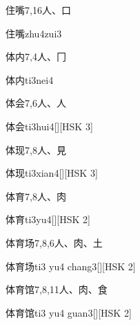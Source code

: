 \begin{entry}{住嘴}{7,16}{⼈、⼝}
  \begin{phonetics}{住嘴}{zhu4zui3}
  \end{phonetics}
\end{entry}

\begin{entry}{体内}{7,4}{⼈、⼌}
  \begin{phonetics}{体内}{ti3nei4}
  \end{phonetics}
\end{entry}

\begin{entry}{体会}{7,6}{⼈、⼈}
  \begin{phonetics}{体会}{ti3hui4}[][HSK 3]
  \end{phonetics}
\end{entry}

\begin{entry}{体现}{7,8}{⼈、⾒}
  \begin{phonetics}{体现}{ti3xian4}[][HSK 3]
  \end{phonetics}
\end{entry}

\begin{entry}{体育}{7,8}{⼈、⾁}
  \begin{phonetics}{体育}{ti3yu4}[][HSK 2]
  \end{phonetics}
\end{entry}

\begin{entry}{体育场}{7,8,6}{⼈、⾁、⼟}
  \begin{phonetics}{体育场}{ti3 yu4 chang3}[][HSK 2]
  \end{phonetics}
\end{entry}

\begin{entry}{体育馆}{7,8,11}{⼈、⾁、⾷}
  \begin{phonetics}{体育馆}{ti3 yu4 guan3}[][HSK 2]
  \end{phonetics}
\end{entry}


